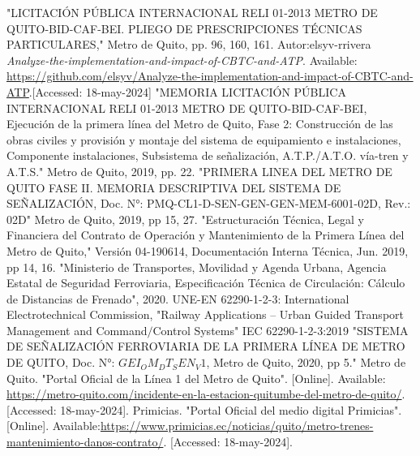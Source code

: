 \documentclass[conference]{IEEEtran}
\begin{document}
\begin{thebibliography}{00}
"LICITACIÓN PÚBLICA INTERNACIONAL RELI 01-2013 METRO DE QUITO-BID-CAF-BEI. PLIEGO DE PRESCRIPCIONES TÉCNICAS PARTICULARES," Metro de Quito, pp. 96, 160, 161.
 Autor:elsyv-rrivera \textit{Analyze-the-implementation-and-impact-of-CBTC-and-ATP}. Available: \url{ https://github.com/elsyv/Analyze-the-implementation-and-impact-of-CBTC-and-ATP}.[Accessed: 18-may-2024]
 "MEMORIA LICITACIÓN PÚBLICA INTERNACIONAL RELI 01-2013 METRO DE QUITO-BID-CAF-BEI, Ejecución de la primera línea del Metro de Quito, Fase 2: Construcción de las obras civiles y provisión y montaje del sistema de equipamiento e instalaciones, Componente instalaciones, Subsistema de señalización, A.T.P./A.T.O. vía-tren y A.T.S." Metro de Quito, 2019, pp. 22.
 "PRIMERA LINEA DEL METRO DE QUITO FASE II. MEMORIA DESCRIPTIVA DEL SISTEMA DE SEÑALIZACIÓN, Doc. N°: PMQ-CL1-D-SEN-GEN-GEN-MEM-6001-02D, Rev.: 02D" Metro de Quito, 2019, pp 15, 27.
 "Estructuración Técnica, Legal y Financiera del Contrato de Operación y Mantenimiento de la Primera Línea del Metro de Quito," Versión 04-190614, Documentación Interna Técnica, Jun. 2019, pp 14, 16.
 "Ministerio de Transportes, Movilidad y Agenda Urbana, Agencia Estatal de Seguridad Ferroviaria, Especificación Técnica de Circulación: Cálculo de Distancias de Frenado", 2020.
UNE-EN 62290-1-2-3: International Electrotechnical Commission, "Railway Applications – Urban Guided Transport Management and Command$/$Control Systems" IEC 62290-1-2-3:2019
"SISTEMA DE SEÑALIZACIÓN FERROVIARIA DE LA PRIMERA LÍNEA DE METRO DE QUITO, Doc. N°: $GEI_OM_DT_SEN_V1$, Metro de Quito, 2020, pp 5."
 Metro de Quito. "Portal Oficial de la Línea 1 del Metro de Quito". [Online]. Available: \url{https://metro-quito.com/incidente-en-la-estacion-quitumbe-del-metro-de-quito/}. [Accessed: 18-may-2024].
 Primicias. "Portal Oficial del medio digital Primicias". [Online]. Available:\url{https://www.primicias.ec/noticias/quito/metro-trenes-mantenimiento-danos-contrato/}. [Accessed: 18-may-2024].



\end{thebibliography}
\end{document}
